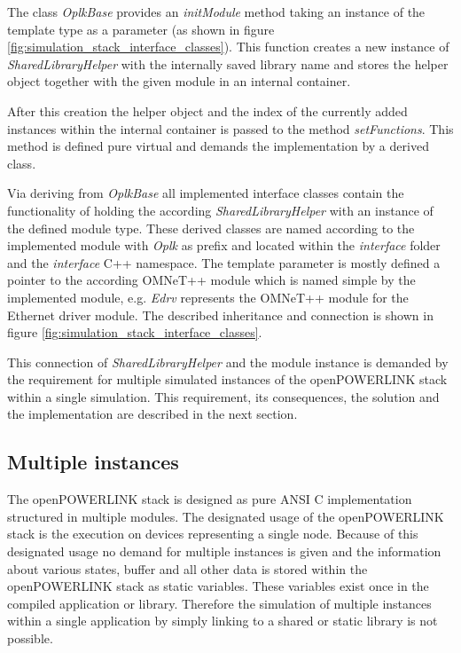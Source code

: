 The class \emph{OplkBase} provides an \emph{initModule} method taking an instance of the template type as a parameter (as shown in figure \ref{fig:simulation_stack_interface_classes}).
This function creates a new instance of \emph{SharedLibraryHelper} with the internally saved library name and stores the helper object together with the given module in an internal container.

After this creation the helper object and the index of the currently added instances within the internal container is passed to the method \emph{setFunctions}.
This method is defined pure virtual and demands the implementation by a derived class.

Via deriving from \emph{OplkBase} all implemented interface classes contain the functionality of holding the according \emph{SharedLibraryHelper} with an instance of the defined module type.
These derived classes are named according to the implemented module with \emph{Oplk} as prefix and located within the \emph{interface} folder and the \emph{interface} C++ namespace.
The template parameter is mostly defined a pointer to the according OMNeT++ module which is named simple by the implemented module, e.g. \emph{Edrv} represents the OMNeT++ module for the Ethernet driver module.
The described inheritance and connection is shown in figure \ref{fig:simulation_stack_interface_classes}.

\begin{sloppypar}
This connection of \emph{SharedLibraryHelper} and the module instance is demanded by the requirement for multiple simulated instances of the openPOWERLINK stack within a single simulation.
This requirement, its consequences, the solution and the implementation are described in the next section.
\end{sloppypar}

\subsection{Multiple instances}
\label{sec:porting_stack_multiinstance}
\begin{sloppypar}
The openPOWERLINK stack is designed as pure ANSI C implementation structured in multiple modules.
The designated usage of the openPOWERLINK stack is the execution on devices representing a single node.
Because of this designated usage no demand for multiple instances is given and the information about various states, buffer and all other data is stored within the openPOWERLINK stack as static variables.
These variables exist once in the compiled application or library.
Therefore the simulation of multiple instances within a single application by simply linking to a shared or static library is not possible.
\end{sloppypar}

